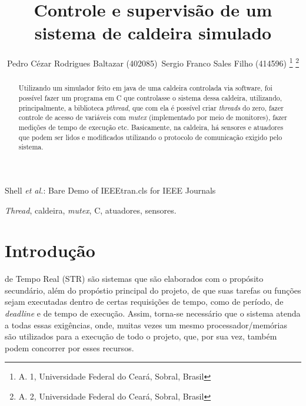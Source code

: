 \documentclass[journal]{IEEEtran}
\begin{document}
	
\title{Controle e supervisão de um sistema de caldeira simulado}

\author{Pedro Cézar Rodrigues Baltazar (402085)~Sergio Franco Sales Filho (414596)%
\thanks{A. 1, Universidade Federal do Ceará, Sobral, Brasil}%
\thanks{A. 2, Universidade Federal do Ceará, Sobral, Brasil}%
}

%
{Shell \MakeLowercase{\textit{et al.}}: Bare Demo of IEEEtran.cls for IEEE Journals}


\maketitle

\begin{abstract}
Utilizando um simulador feito em java de uma caldeira controlada via software, foi possível
fazer um programa em C que controlasse o sistema dessa caldeira, utilizando, principalmente, a biblioteca \textit{pthread}, que com
ela é possível criar \textit{threads} do zero, fazer controle de acesso de variáveis com
\textit{mutex} (implementado por meio de monitores), fazer medições de tempo de execução etc. Basicamente, na caldeira, há sensores
e atuadores que podem ser lidos e modificados utilizando o protocolo de comunicação exigido
pelo sistema.
\end{abstract}

\begin{IEEEkeywords}
\textit{Thread}, caldeira, \textit{mutex}, C, atuadores, sensores.
\end{IEEEkeywords}

\IEEEpeerreviewmaketitle

\section{Introdução}

 de Tempo Real (STR) são sistemas que são elaborados com o propósito secundário, além
do propóstio principal do projeto, de que suas tarefas ou funções sejam executadas dentro
de certas requisições de tempo, como de período, de \textit{deadline} e de tempo de execução.
Assim, torna-se necessário que o sistema atenda a todas essas exigências, onde, muitas vezes
um mesmo processador/memórias são utilizados para a execução de todo o projeto, que, por sua vez, também
podem concorrer por esses recursos.
\end{document}
